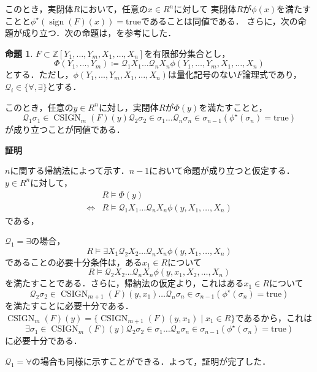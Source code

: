 \documentclass[uplatex, dvipdfmx]{jsarticle}
\makeatletter
\numberwithin{equation}{section}
\renewenvironment{proof}[1][\proofname]{\par
  \pushQED{\qed}%
  \normalfont \topsep6\p@\@plus6\p@\relax
  \trivlist
  \item\relax
  {\bfseries
  #1\@addpunct{.}}\hspace\labelsep\ignorespaces
}{
  \popQED\endtrivlist\@endpefalse
}
\newcommand{\Z}{\mathbb{Z}}
\newcommand{\Qua}{\mathcal{Q}}
\newcommand{\true}{\text{true}}
\DeclareMathOperator{\sign}{sign}
\DeclareMathOperator{\CSIGN}{CSIGN}
\theoremstyle{definition}
\newtheorem{proposition}[definition]{命題}
\renewcommand{\proofname}{\textbf{証明}}
\makeatother
\begin{document}
このとき，実閉体$R$において，任意の$x \in R^n$に対して
実閉体$R$が$\phi(x)$を満たすことと$\phi^\star(\sign(F)(x)) = \true$であることは同値である．
さらに，次の命題が成り立つ．次の命題は，\cite[Proposition 11.14]{MR2248869}を参考にした．

\begin{proposition} \label{proposition:qe-cad}
     $F \subset \Z[Y_1, \dots, Y_m, X_1, \dots, X_n]$を有限部分集合とし，
     \begin{equation}
          \Phi(Y_1, \dots, Y_m) \coloneqq \Qua_1 X_1 \dots \Qua_n X_n \phi(Y_1, \dots, Y_m, X_1, \dots, X_n)
     \end{equation}
     とする．ただし，$\phi(Y_1, \dots, Y_m, X_1, \dots, X_n)$は量化記号のない$F$論理式であり，$\Qua_i \in \{\forall, \exists\}$とする．

     このとき，任意の$y \in R^n$に対し，実閉体$R$が$\Phi(y)$を満たすことと，
     \begin{equation}
          \Qua_1 \sigma_1 \in \CSIGN_m(F)(y) \Qua_2 \sigma_2 \in \sigma_1 \dots \Qua_n \sigma_n \in \sigma_{n-1} (\phi^\star(\sigma_n) = \true)
     \end{equation}
     が成り立つことが同値である．
\end{proposition}

\begin{proof}
     $n$に関する帰納法によって示す．$n-1$において命題が成り立つと仮定する．$y \in R^n$に対して，
     \begin{align}
               & R \models \Phi(y)\\
          \iff & R \models \Qua_1 X_1 \dots \Qua_n X_n \phi(y, X_1, \dots, X_n)
     \end{align}
     である，
     
     $\Qua_1 = \exists$の場合，
     \begin{equation}
          R \models \exists X_1 \Qua_2 X_2 \dots \Qua_n X_n \phi(y, X_1, \dots, X_n)
     \end{equation}
     であることの必要十分条件は，ある$x_1 \in R$について 
     \begin{equation}
          R \models \Qua_2 X_2 \dots \Qua_n X_n \phi(y, x_1, X_2, \dots, X_n)
     \end{equation}
     を満たすことである．さらに，帰納法の仮定より，これはある$x_1 \in R$について
     \begin{equation}
          \Qua_2 \sigma_2 \in \CSIGN_{m+1}(F)(y, x_1) \dots \Qua_n \sigma_n \in \sigma_{n-1} (\phi^\star(\sigma_n) = \true)
     \end{equation}
     を満たすことに必要十分である．$\CSIGN_m(F)(y) = \{\CSIGN_{m+1}(F)(y, x_1) \mid x_1 \in R\}$であるから，これは
     \begin{equation}
          \exists \sigma_1 \in \CSIGN_m(F)(y) \Qua_2 \sigma_2 \in \sigma_1 \dots \Qua_n \sigma_n \in \sigma_{n-1} (\phi^\star(\sigma_n) = \true)
     \end{equation}
     に必要十分である．
     
     $\Qua_1 = \forall$の場合も同様に示すことができる．よって，証明が完了した．
\end{proof}
\end{document}
